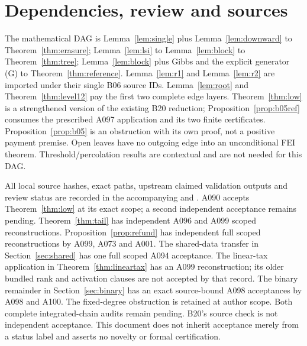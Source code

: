 \documentclass[11pt]{article}
\begin{document}
\section{Dependencies, review and sources}
The mathematical DAG is Lemma~\ref{lem:single} plus
Lemma~\ref{lem:downward} to Theorem~\ref{thm:erasure};
Lemma~\ref{lem:lsi} to Lemma~\ref{lem:block} to
Theorem~\ref{thm:tree}; Lemma~\ref{lem:block} plus Gibbs and
the explicit generator (G) to Theorem~\ref{thm:reference}.
Lemma~\ref{lem:r1} and Lemma~\ref{lem:r2} are imported under their
single B06 source IDs. Lemma~\ref{lem:root} and
Theorem~\ref{thm:level12} pay the first two complete edge layers.
Theorem~\ref{thm:low} is a strengthened version of the existing
B20 reduction; Proposition~\ref{prop:b05ref} consumes the prescribed
A097 application and its two finite certificates.
Proposition~\ref{prop:b05} is an obstruction with its own proof,
not a positive payment premise. Open leaves have no outgoing edge
into an unconditional FEI theorem. Threshold/percolation results
are contextual and are not needed for this DAG.

All local source hashes, exact paths, upstream claimed validation
outputs and review status are recorded in the accompanying
 and .
A090 accepts Theorem~\ref{thm:low} at its exact scope; a second
independent acceptance remains pending. Theorem~\ref{thm:tail} has
independent A096 and A099 scoped reconstructions. Proposition~\ref{prop:refund} has independent full scoped reconstructions
by A099, A073 and A001. The shared-data transfer in Section~\ref{sec:shared}
has one full scoped A094 acceptance. The linear-tax application in
Theorem~\ref{thm:lineartax} has an A099 reconstruction; its older bundled
rank and activation clauses are not accepted by that record. The binary
remainder in Section~\ref{sec:binary} has an exact source-bound A098
acceptances by A098 and A100. The fixed-degree obstruction is retained at author scope.
Both complete integrated-chain audits remain pending. B20's source check
is not independent acceptance. This document does not inherit acceptance
merely from a status label and asserts no novelty or formal certification.
\end{document}
